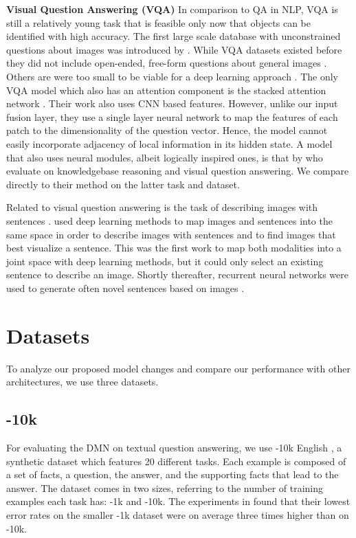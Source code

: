 \documentclass{article}
\begin{document}
\textbf{Visual Question Answering (VQA)}
In comparison to QA in NLP, VQA is still a relatively young task that is feasible only now that objects can be identified with high accuracy.
The first large scale database with unconstrained questions about images was introduced by \citet{Antol2015}.
While VQA datasets existed before they did not include open-ended, free-form questions about general images \cite{Geman2014}.
Others are were too small to be viable for a deep learning approach \cite{Malinowski2014}. 
The only VQA model which also has an attention component is the stacked attention network \cite{yang2015stacked}.
Their work also uses CNN based features.
However, unlike our input fusion layer, they use a single layer neural network to map the features of each patch to the dimensionality of the question vector.
Hence, the model cannot easily incorporate adjacency of local information in its hidden state.
A model that also uses neural modules, albeit logically inspired ones, is that by \citet{andreas2016learning} who evaluate on knowledgebase reasoning and visual question answering. We compare directly to their method on the latter task and dataset.


Related to visual question answering is the task of describing images with sentences \cite{Kulkarni11}.
\citet{Socher2014TACL} used deep learning methods to map images and sentences into the same space in order to describe images with sentences and to find images that best visualize a sentence.
This was the first work to map both modalities into a joint space with deep learning methods, but it could only select an existing sentence to describe an image. Shortly thereafter, recurrent neural networks were used to generate often novel sentences based on images \cite{Karpathy2015,Chen2014,Fang2015,Xu2015}.

\section{Datasets}

To analyze our proposed model changes and compare our performance with other architectures, we use three datasets.

\subsection{\babi-10k}

For evaluating the DMN on textual question answering, we use \babi-10k English \cite{Weston2015ToyTasks}, a synthetic dataset which features 20 different tasks.
Each example is composed of a set of facts, a question, the answer, and the supporting facts that lead to the answer.
The dataset comes in two sizes, referring to the number of training examples each task has: \babi-1k and \babi-10k.
The experiments in \citet{Sukhbaatar2015} found that their lowest error rates on the smaller \babi-1k dataset were on average three times higher than on \babi-10k.
\end{document}
